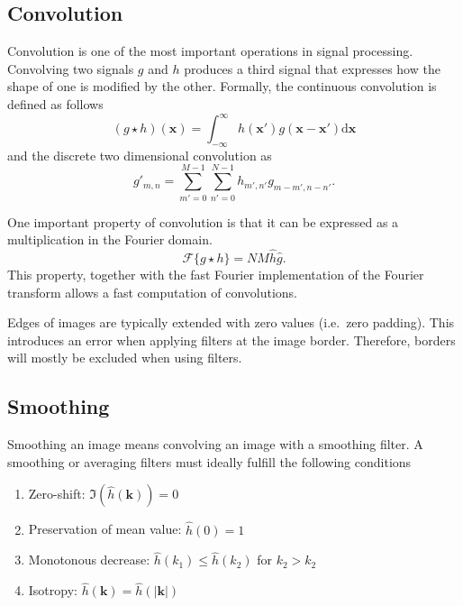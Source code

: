 		\subsection{Convolution}
		Convolution is one of the most important operations in signal processing. Convolving two signals $g$ and $h$ produces a third signal that expresses how the shape of one is modified by the other. Formally, the continuous convolution is defined as follows
		\begin{equation}
			(g \star h)(\mathbf{x}) = \int_{-\infty}^{\infty} 
			h(\mathbf{x}') g(\mathbf{x} - \mathbf{x}')
			\text{d}\mathbf{x}
		\end{equation}
		and the discrete two dimensional convolution as
		\begin{equation}
			g'_{m,n} = \sum_{m'=0}^{M-1} \sum_{n'=0}^{N-1}
			h_{m',n'} g_{m-m', n-n'}.
		\end{equation}
		
		One important property of convolution is that it can be expressed as a multiplication in the Fourier domain. 
		\begin{equation}
		\mathscr{F}\{g \star h\} = N M \hat{h} \hat{g}.
		\end{equation}
		This property, together with the fast Fourier implementation of the Fourier transform allows a fast computation of convolutions. 
		
		Edges of images are typically extended with zero values (i.e.\ zero padding). This introduces an error when applying filters at the image border. Therefore, borders will mostly be excluded when using filters.
		
		\subsection{Smoothing}\label{sect:smoothing}
		Smoothing an image means convolving an image with a smoothing filter. A smoothing or averaging filters must ideally fulfill the following conditions
		\begin{enumerate}
			\item Zero-shift: $\Im (\hat{h}(\mathbf{k})) = 0$
			\item Preservation of mean value: $\hat{h}(0) = 1 $
			\item Monotonous decrease: $ \hat{h}(k_1) \leq \hat{h}(k_2) $ for $ k_2 > k_2 $
			\item Isotropy: $\hat{h}(\mathbf{k}) = \hat{h}(| \mathbf{k} |)$
		\end{enumerate}
		
